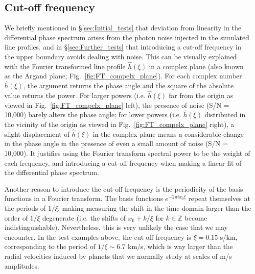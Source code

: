\subsection{Cut-off frequency}
\label{sec:noise}

We briefly mentioned in \S\ref{sec:Initial_tests} that deviation from linearity in the differential phase spectrum arises from the photon noise injected in the simulated line profiles, and in \S\ref{sec:Further_tests} that introducing a cut-off frequency in the upper boundary avoids dealing with noise. This can be visually explained with the Fourier transformed line profile $\hat{h}(\xi)$ in a complex plane (also known as the Argand plane; Fig.~\ref{fig:FT_compelx_plane}). For each complex number $\hat{h}(\xi)$, the argument returns the phase angle and the square of the absolute value returns the power. For larger powers (i.e. $\hat{h}(\xi)$ far from the origin as viewed in Fig.~\ref{fig:FT_compelx_plane} left), the presence of noise (S/N = 10,000) barely alters the phase angle; for lower powers (i.e. $\hat{h}(\xi)$ distributed in the vicinity of the origin as viewed in Fig.~\ref{fig:FT_compelx_plane} right), a slight displacement of $\hat{h}(\xi)$ in the complex plane means a considerable change in the phase angle in the presence of even a small amount of noise (S/N = 10,000). It justifies using the Fourier transform spectral power to be the weight of each frequency, and introducing a cut-off frequency when making a linear fit of the differential phase spectrum. 

Another reason to introduce the cut-off frequency is the periodicity of the basis functions in a Fourier transform. The basis functions $e^{-2 \pi ix_0 \xi}$ repeat themselves at the periods of $1/\xi$, making measuring the shift in the time domain larger than the order of $1/\xi$ degenerate (i.e. the shifts of $x_0+k/\xi$ for $k\in\mathbb{Z}$ become indistinguishable). Nevertheless, this is very unlikely the case that we may encounter. In the test examples above, the cut-off frequency is $\xi = 0.15$ s/km, corresponding to the period of $1/\xi\sim6.7$ km/s, which is way larger than the radial velocities induced by planets that we normally study at scales of m/s amplitudes. 

